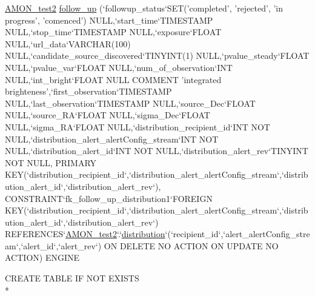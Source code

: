 \begin{DoxyCompactItemize}
\hyperlink{db__mc__build_8sql_a19c21c59303d8b6591b92240ff7de1d5}{A\-M\-O\-N\-\_\-test2} \hyperlink{db__mc__build_8sql_a58a14be34a0480506518171a15e08c43}{follow\-\_\-up} (`followup\-\_\-status`S\-E\-T('completed', 'rejected', 'in progress', 'comenced') N\-U\-L\-L,`start\-\_\-time`T\-I\-M\-E\-S\-T\-A\-M\-P N\-U\-L\-L,`stop\-\_\-time`T\-I\-M\-E\-S\-T\-A\-M\-P N\-U\-L\-L,`exposure`F\-L\-O\-A\-T N\-U\-L\-L,`url\-\_\-data`V\-A\-R\-C\-H\-A\-R(100) N\-U\-L\-L,`candidate\-\_\-source\-\_\-discovered`T\-I\-N\-Y\-I\-N\-T(1) N\-U\-L\-L,`pvalue\-\_\-steady`F\-L\-O\-A\-T N\-U\-L\-L,`pvalue\-\_\-var`F\-L\-O\-A\-T N\-U\-L\-L,`num\-\_\-of\-\_\-observation`I\-N\-T N\-U\-L\-L,`int\-\_\-bright`F\-L\-O\-A\-T N\-U\-L\-L C\-O\-M\-M\-E\-N\-T 'integrated brighteness',`first\-\_\-observation`T\-I\-M\-E\-S\-T\-A\-M\-P N\-U\-L\-L,`last\-\_\-observation`T\-I\-M\-E\-S\-T\-A\-M\-P N\-U\-L\-L,`source\-\_\-\-Dec`F\-L\-O\-A\-T N\-U\-L\-L,`source\-\_\-\-R\-A`F\-L\-O\-A\-T N\-U\-L\-L,`sigma\-\_\-\-Dec`F\-L\-O\-A\-T N\-U\-L\-L,`sigma\-\_\-\-R\-A`F\-L\-O\-A\-T N\-U\-L\-L,`distribution\-\_\-recipient\-\_\-id`I\-N\-T N\-O\-T N\-U\-L\-L,`distribution\-\_\-alert\-\_\-alert\-Config\-\_\-stream`I\-N\-T N\-O\-T N\-U\-L\-L,`distribution\-\_\-alert\-\_\-id`I\-N\-T N\-O\-T N\-U\-L\-L,`distribution\-\_\-alert\-\_\-rev`T\-I\-N\-Y\-I\-N\-T N\-O\-T N\-U\-L\-L, P\-R\-I\-M\-A\-R\-Y K\-E\-Y(`distribution\-\_\-recipient\-\_\-id`,`distribution\-\_\-alert\-\_\-alert\-Config\-\_\-stream`,`distribution\-\_\-alert\-\_\-id`,`distribution\-\_\-alert\-\_\-rev`), C\-O\-N\-S\-T\-R\-A\-I\-N\-T`fk\-\_\-follow\-\_\-up\-\_\-distribution1`F\-O\-R\-E\-I\-G\-N K\-E\-Y(`distribution\-\_\-recipient\-\_\-id`,`distribution\-\_\-alert\-\_\-alert\-Config\-\_\-stream`,`distribution\-\_\-alert\-\_\-id`,`distribution\-\_\-alert\-\_\-rev`) R\-E\-F\-E\-R\-E\-N\-C\-E\-S`\hyperlink{db__mc__build_8sql_a19c21c59303d8b6591b92240ff7de1d5}{A\-M\-O\-N\-\_\-test2}`.`\hyperlink{db__mc__build_8sql_ab44b8b976cf1914aa2a84f43c304aadf}{distribution}`(`recipient\-\_\-id`,`alert\-\_\-alert\-Config\-\_\-stream`,`alert\-\_\-id`,`alert\-\_\-rev`) O\-N D\-E\-L\-E\-T\-E N\-O A\-C\-T\-I\-O\-N O\-N U\-P\-D\-A\-T\-E N\-O A\-C\-T\-I\-O\-N) E\-N\-G\-I\-N\-E
\item 
C\-R\-E\-A\-T\-E T\-A\-B\-L\-E I\-F N\-O\-T E\-X\-I\-S\-T\-S \\*

\end{DoxyCompactItemize}
